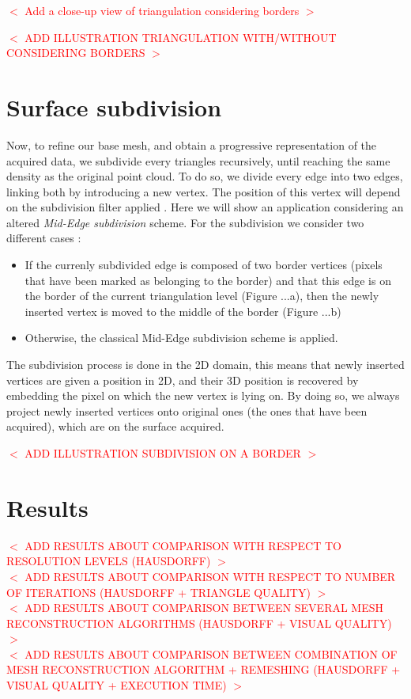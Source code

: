 \documentclass[11pt,fleqn]{book} %
\newcommand{\arnaud}[1]{\textcolor{red}{$<$ #1 $>$}}
\begin{document}
\arnaud{Add a close-up view of triangulation considering borders}

\arnaud{ADD ILLUSTRATION TRIANGULATION WITH/WITHOUT CONSIDERING BORDERS}

\section{Surface subdivision}
\label{sec:surface_subdivision}

Now, to refine our base mesh, and obtain a progressive representation of the acquired data, we subdivide every triangles recursively, until reaching the same density as the original point cloud.
To do so, we divide every edge into two edges, linking both by introducing a new vertex. The position of this vertex will depend on the subdivision filter applied \cite{PR08}.
Here we will show an application considering an altered \textit{Mid-Edge subdivision} scheme.
For the subdivision we consider two different cases :
\begin{itemize}
	\item If the currenly subdivided edge is composed of two border vertices (pixels that have been marked as belonging to the border) and that this edge is on the border of the current triangulation level (Figure ...a), then the newly inserted vertex is moved to the middle of the border (Figure ...b)
	\item Otherwise, the classical Mid-Edge subdivision scheme is applied.
\end{itemize}

The subdivision process is done in the 2D domain, this means that newly inserted vertices are given a position in 2D, and their 3D position is recovered by embedding the pixel on which the new vertex is lying on.
By doing so, we always project newly inserted vertices onto original ones (the ones that have been acquired), which are on the surface acquired.

\arnaud{ADD ILLUSTRATION SUBDIVISION ON A BORDER}

\section{Results}

\arnaud{ADD RESULTS ABOUT COMPARISON WITH RESPECT TO RESOLUTION LEVELS (HAUSDORFF)}\\
\arnaud{ADD RESULTS ABOUT COMPARISON WITH RESPECT TO NUMBER OF ITERATIONS (HAUSDORFF + TRIANGLE QUALITY)}\\
\arnaud{ADD RESULTS ABOUT COMPARISON BETWEEN SEVERAL MESH RECONSTRUCTION ALGORITHMS (HAUSDORFF + VISUAL QUALITY)}\\
\arnaud{ADD RESULTS ABOUT COMPARISON BETWEEN COMBINATION OF MESH RECONSTRUCTION ALGORITHM + REMESHING (HAUSDORFF + VISUAL QUALITY + EXECUTION TIME)}
\end{document}
